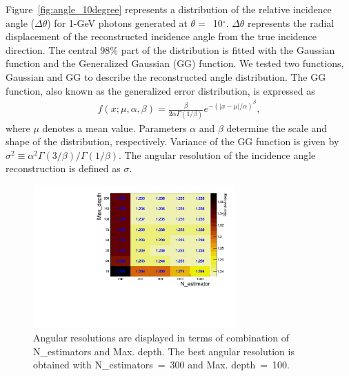 \documentclass[preprint,12pt,times,a4paper]{elsarticle}
\begin{document}
Figure~\ref{fig:angle_10degree} represents a distribution of the relative incidence angle ($\Delta\theta$) for 1-GeV photons generated at $\theta=$~10$^{\circ}$. $\Delta\theta$ represents the radial displacement of the reconstructed incidence angle from the true incidence direction. The central 98\% part of the distribution is fitted with the Gaussian function and the Generalized Gaussian (GG) function. We tested two functions, Gaussian and GG to describe the reconstructed angle distribution. The GG function, also known as the generalized error distribution, is expressed as
\begin{eqnarray} 
f(x; \mu, \alpha, \beta) = \frac{\beta}{2 \alpha \Gamma(1/\beta)}e^{-(|x-\mu|/\alpha)^\beta},
\label{eqn:gg}
\end{eqnarray}
where $\mu$ denotes a mean value. Parameters $\alpha$ and $\beta$ determine the scale and shape of the distribution, respectively. Variance of the GG function is given by $\sigma^2 \equiv \alpha^2 \Gamma(3/\beta) / \Gamma(1/\beta)$. The angular resolution of the incidence angle reconstruction is defined as $\sigma$.

\begin{figure}[!hbt]
\centering
\includegraphics[width=0.69\textwidth]{figures/Fig4_Opt.pdf}
\caption{Angular resolutions are displayed in terms of combination of N\_estimators and Max. depth. The best angular resolution is obtained with N\_estimators~=~300 and Max. depth~=~100. }
\label{fig:par_scan}
\end{figure}
\end{document}
